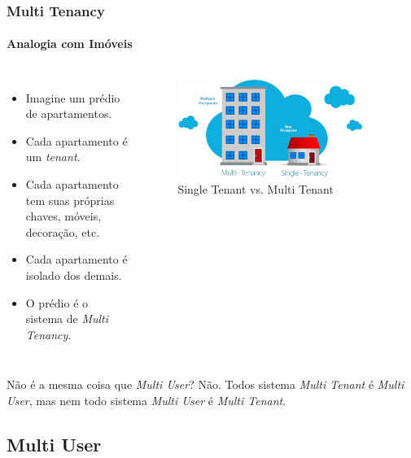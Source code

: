 \documentclass[
	9pt, %
	t, %
]{beamer}
\begin{document}
\begin{frame}
	\frametitle{Multi Tenancy}
	\framesubtitle{Analogia com Imóveis}
	
	\begin{columns}
		\begin{itemize}
			\item Imagine um prédio de apartamentos.
			\item Cada apartamento é um \textit{tenant}.
			\item Cada apartamento tem suas próprias chaves, móveis, decoração, etc.
			\item Cada apartamento é isolado dos demais.
			\item O prédio é o sistema de \textit{Multi Tenancy}.
		\end{itemize}

		\begin{figure}
			\centering
			\includegraphics[width=0.9\textwidth]{multitenancy_imoveis.jpg}
			\caption{Single Tenant vs. Multi Tenant}
		\end{figure}

	\end{columns}

	\begin{block}{Não é a mesma coisa que \textit{Multi User}?}
		Não. Todos sistema \textit{Multi Tenant} é \textit{Multi User}, mas nem todo sistema \textit{Multi User} é \textit{Multi Tenant}.
	\end{block}

\end{frame}

\subsection{Multi User}
\end{document}
